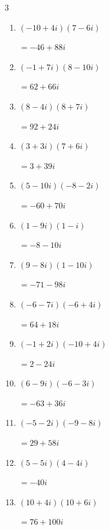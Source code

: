 \begin{multicols}{3}
\begin{enumerate}
        $\displaystyle =-2+68i$

  \item $\displaystyle (-10+4i)(7-6i)$

        $\displaystyle =-46+88i$

  \item $\displaystyle (-1+7i)(8-10i)$

        $\displaystyle =62+66i$

  \item $\displaystyle (8-4i)(8+7i)$

        $\displaystyle =92+24i$

  \item $\displaystyle (3+3i)(7+6i)$

        $\displaystyle =3+39i$

  \item $\displaystyle (5-10i)(-8-2i)$

        $\displaystyle =-60+70i$

\columnbreak %

  \item $\displaystyle (1-9i)(1-i)$

        $\displaystyle =-8-10i$

  \item $\displaystyle (9-8i)(1-10i)$

        $\displaystyle =-71-98i$

  \item $\displaystyle (-6-7i)(-6+4i)$

        $\displaystyle =64+18i$

  \item $\displaystyle (-1+2i)(-10+4i)$

        $\displaystyle =2-24i$

  \item $\displaystyle (6-9i)(-6-3i)$

        $\displaystyle =-63+36i$

  \item $\displaystyle (-5-2i)(-9-8i)$

        $\displaystyle =29+58i$

  \item $\displaystyle (5-5i)(4-4i)$

        $\displaystyle =-40i$

  \item $\displaystyle (10+4i)(10+6i)$

        $\displaystyle =76+100i$


\end{enumerate}
\end{multicols}
